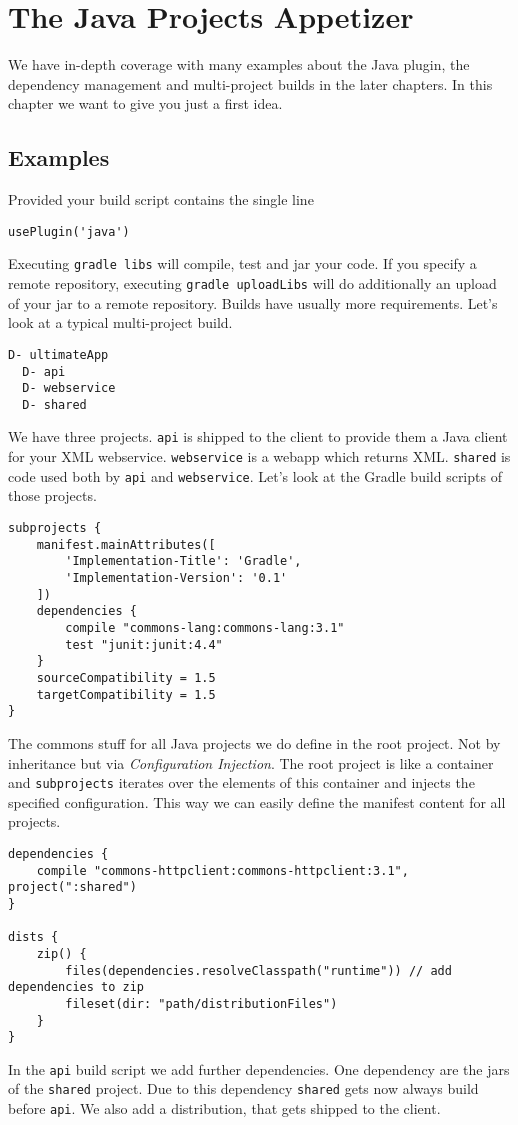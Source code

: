 \chapter{The Java Projects Appetizer} %
\label{cha:the_java_projects_tutorial}
We have in-depth coverage with many examples about the Java plugin, the dependency management and multi-project builds in the later chapters. In this chapter we want to give you just a first idea.

\section{Examples} %
\label{sec:examples}
Provided your build script contains the single line
\begin{Verbatim}
usePlugin('java')
\end{Verbatim}
Executing \texttt{gradle libs} will compile, test and jar your code. If you specify a remote repository, executing \texttt{gradle uploadLibs} will do additionally an upload of your jar to a remote repository. 
Builds have usually more requirements. Let's look at a typical multi-project build.

\begin{Verbatim}[frame=single,label=Project Tree]
D- ultimateApp
  D- api
  D- webservice
  D- shared 
\end{Verbatim}
We have three projects. \texttt{api} is shipped to the client to provide them a Java client for your XML webservice. \texttt{webservice} is a webapp which returns XML. \texttt{shared} is code used both by \texttt{api} and \texttt{webservice}. Let's look at the Gradle build scripts of those projects.

\begin{Verbatim}[frame=single,label=ultimateApp]
subprojects {
    manifest.mainAttributes([	       
	    'Implementation-Title': 'Gradle',
		'Implementation-Version': '0.1'
	])
	dependencies {
		compile "commons-lang:commons-lang:3.1"
		test "junit:junit:4.4"
	}
	sourceCompatibility = 1.5
	targetCompatibility = 1.5
}
\end{Verbatim}
The commons stuff for all Java projects we do define in the root project. Not by inheritance but via \emph{Configuration Injection}. The root project is like a container and \texttt{subprojects} iterates over the elements of this container and injects the specified configuration. This way we can easily define the manifest content for all projects.

\begin{Verbatim}[frame=single,label=api]
dependencies {
	compile "commons-httpclient:commons-httpclient:3.1", project(":shared")
}

dists {
	zip() {
		files(dependencies.resolveClasspath("runtime")) // add dependencies to zip
		fileset(dir: "path/distributionFiles")
	}
}
\end{Verbatim}
In the \texttt{api} build script we add further dependencies. One dependency are the jars of the \texttt{shared} project. Due to this dependency \texttt{shared} gets now always build before \texttt{api}. We also add a distribution, that gets shipped to the client.



